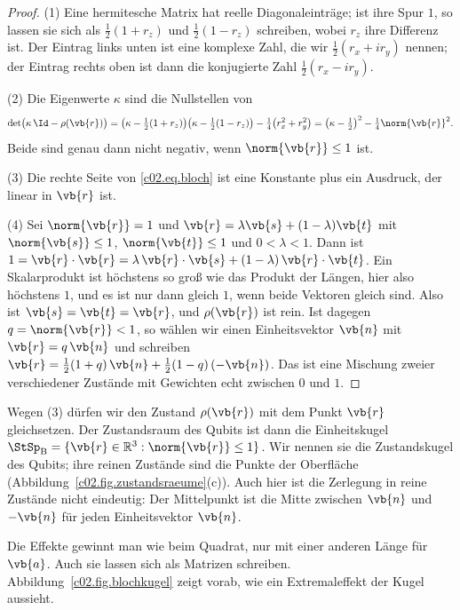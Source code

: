 \begin{proof}
  (1) Eine hermitesche Matrix hat reelle Diagonaleinträge; ist ihre Spur $1$, so lassen
  sie sich als $\tfrac12(1 + r_z)$ und $\tfrac12(1 - r_z)$ schreiben, wobei $r_z$ ihre
  Differenz ist. Der Eintrag links unten ist eine komplexe Zahl, die wir
  $\tfrac12(r_x + i r_y)$ nennen; der Eintrag rechts oben ist dann die konjugierte Zahl
  $\tfrac12(r_x - i r_y)$.

  (2) Die Eigenwerte $\kappa$ sind die Nullstellen von
  \begin{equation*}
    \det\bigl(\kappa\, \Id - \rho(\vb{r})\bigr)
    = \bigl(\kappa - \tfrac12(1 + r_z)\bigr)\bigl(\kappa - \tfrac12(1 - r_z)\bigr) - \tfrac14\bigl(r_x^2 + r_y^2\bigr)
    = \bigl(\kappa - \tfrac12\bigr)^2 - \tfrac14 \norm{\vb{r}}^2 .
  \end{equation*}
  Beide sind genau dann nicht negativ, wenn $\norm{\vb{r}} \leq 1$ ist.

  (3) Die rechte Seite von \eqref{c02.eq.bloch} ist eine Konstante plus ein Ausdruck, der
  linear in $\vb{r}$ ist.

  (4) Sei $\norm{\vb{r}} = 1$ und $\vb{r} = \lambda \vb{s} + (1-\lambda)\vb{t}$ mit
  $\norm{\vb{s}} \leq 1$, $\norm{\vb{t}} \leq 1$ und $0 < \lambda < 1$. Dann ist
  $1 = \vb{r}\cdot\vb{r} = \lambda\, \vb{r}\cdot\vb{s} + (1-\lambda)\, \vb{r}\cdot\vb{t}$.
  Ein Skalarprodukt ist höchstens so groß wie das Produkt der Längen, hier also höchstens
  $1$, und es ist nur dann gleich $1$, wenn beide Vektoren gleich sind. Also ist
  $\vb{s} = \vb{t} = \vb{r}$, und $\rho(\vb{r})$ ist rein. Ist dagegen
  $q = \norm{\vb{r}} < 1$, so wählen wir einen Einheitsvektor $\vb{n}$ mit
  $\vb{r} = q\,\vb{n}$ und schreiben
  $\vb{r} = \tfrac12(1+q)\,\vb{n} + \tfrac12(1-q)\,(-\vb{n})$. Das ist eine Mischung zweier
  verschiedener Zustände mit Gewichten echt zwischen $0$ und $1$.
\end{proof}

Wegen (3) dürfen wir den Zustand $\rho(\vb{r})$ mit dem Punkt $\vb{r}$ gleichsetzen. Der
Zustandsraum des Qubits ist dann die Einheitskugel
$\StSp_{\mathrm{B}} = \{ \vb{r} \in \mathbb{R}^3 : \norm{\vb{r}} \leq 1 \}$. Wir nennen
sie die Zustandskugel des Qubits; ihre reinen Zustände sind die Punkte der Oberfläche
(Abbildung~\ref{c02.fig.zustandsraeume}(c)). Auch hier ist die Zerlegung in reine Zustände
nicht eindeutig: Der Mittelpunkt ist die Mitte zwischen $\vb{n}$ und $-\vb{n}$ für jeden
Einheitsvektor $\vb{n}$.

Die Effekte gewinnt man wie beim Quadrat, nur mit einer anderen Länge für $\vb{a}$. Auch
sie lassen sich als Matrizen schreiben. Abbildung~\ref{c02.fig.blochkugel} zeigt vorab,
wie ein Extremaleffekt der Kugel aussieht.

